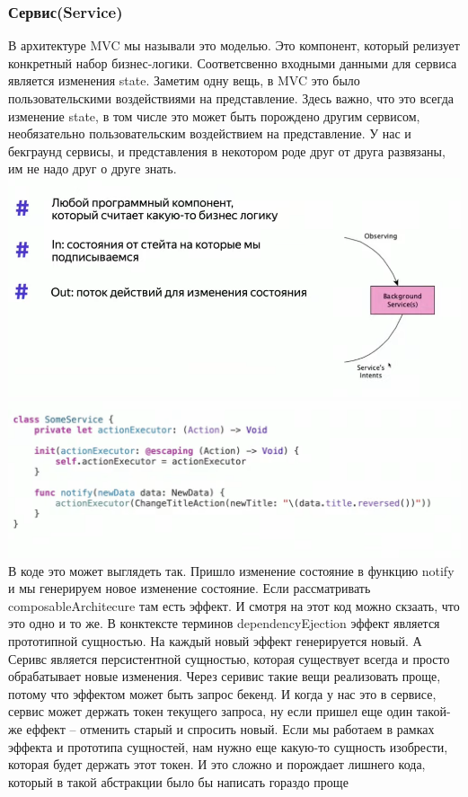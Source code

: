 \documentclass{article}
\begin{document}
    \subsubsection{Сервис(Service)}
    В архитектуре MVC мы называли это моделью. Это компонент, который релизует конкретный набор бизнес-логики. Соответсвенно входными данными для сервиса является изменения state. Заметим одну вещь, в MVC это было пользовательскими воздействиями на представление. Здесь важно, что это всегда изменение state, в том числе это может быть порождено другим сервисом, необязательно пользовательским воздействием на представление. У нас и бекграунд сервисы, и представления в некотором роде друг от друга развязаны, им не надо друг о друге знать. 
    \newline
    \includegraphics[scale = 0.5]{pic/Снимок экрана 2023-07-30 в 22.09.02.png}
    \newline
    \includegraphics[scale = 0.3]{pic/Снимок экрана 2023-07-30 в 22.09.39.png}
    \newline
    В коде это может выглядеть так. Пришло изменение состояние в функцию notify и мы генерируем новое изменение состояние. Если рассматривать composableArchitecure там есть эффект. И смотря на этот код можно скзаать, что это одно и то же. В конктексте терминов dependencyEjection эффект является прототипной сущностью. На каждый новый эффект генерируется новый. А Серивс является персистентной сущностью, которая существует всегда и просто обрабатывает новые изменения. Через серивис такие вещи реализовать проще, потому что эффектом может быть запрос бекенд. И когда у нас это в сервисе, сервис может держать токен текущего запроса, ну если пришел еще один такой-же еффект -- отменить старый и спросить новый. Если мы работаем в рамках эффекта и прототипа сущностей, нам нужно еще какую-то сущность изобрести, которая будет держать этот токен. И это сложно и порождает лишнего кода, который в такой абстракции было бы написать гораздо проще
\end{document}
